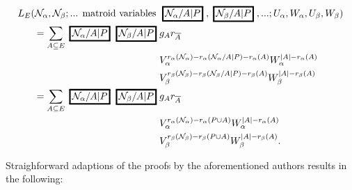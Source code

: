 \documentclass[Unicode]{cedram-alco}
\newcommand{\MVar}[1]{
  \setlength\fboxrule{1.5pt}
  \setlength\fboxsep{1.5pt}
  {\;\framebox{\ensuremath{#1}}\;}}
\begin{document}
\begin{defi}
\begin{equation}
  \begin{split}
    L_E(\mathcal{N}_\alpha,\mathcal{N_\beta};\text{... matroid variables } &
    \MVar{\mathcal{N}_\alpha/A|P}, \MVar{\mathcal{N}_\beta/A|P}, \text{...};
    U_\alpha,W_\alpha,U_\beta,W_\beta) \\
    =\sum_{A\subseteq E}\MVar{\mathcal{N}_\alpha/A|P}\MVar{\mathcal{N}_\beta/A|P}
& g_A r_{\overline{A}} \\
& V_\alpha^{r_\alpha(\mathcal{N}_\alpha)-r_\alpha(\mathcal{N}_\alpha/A|P)-r_\alpha(A)} 
 W_\alpha^{|A|-r_\alpha(A)} \\
& V_\beta^{r_\beta(\mathcal{N}_\beta)-r_\beta(\mathcal{N}_\beta/A|P)-r_\beta(A)} 
 W_\beta^{|A|-r_\beta(A)}  \\
 =
 \sum_{A\subseteq E}\MVar{\mathcal{N}_\alpha/A|P}\MVar{\mathcal{N}_\beta/A|P}
 & g_A r_{\overline{A}} \\
 & V_\alpha^{r_\alpha(\mathcal{N}_\alpha)-r_\alpha(P\cup A)} 
 W_\alpha^{|A|-r_\alpha(A)} \\
& V_\beta^{r_\beta(\mathcal{N}_\beta)-r_\beta(P \cup A)} 
 W_\beta^{|A|-r_\beta(A)}. 
  \end{split}
\end{equation}
\end{defi}


Straighforward adaptions of the proofs by the aforementioned authors
results in the following:

\begin{theo}

\end{theo}



\newpage
\end{document}
